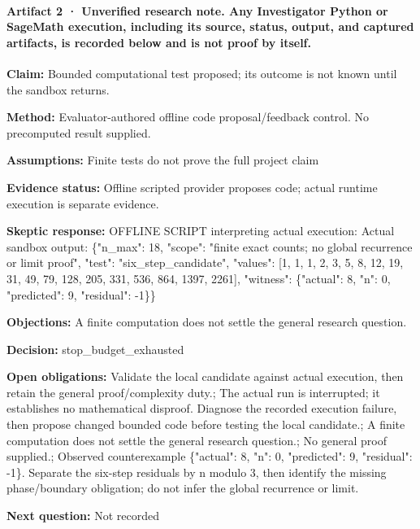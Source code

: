 \documentclass[11pt]{article}
\begin{document}
\paragraph{Artifact 2 · Unverified research note. Any Investigator Python or SageMath execution, including its source, status, output, and captured artifacts, is recorded below and is not proof by itself.}
\textbf{Claim:} Bounded computational test proposed; its outcome is not known until the sandbox returns.\par
\textbf{Method:} Evaluator-authored offline code proposal/feedback control. No precomputed result supplied.\par
\textbf{Assumptions:} Finite tests do not prove the full project claim\par
\textbf{Evidence status:} Offline scripted provider proposes code; actual runtime execution is separate evidence.\par
\textbf{Skeptic response:} OFFLINE SCRIPT interpreting actual execution: Actual sandbox output: \{"n\_max": 18, "scope": "finite exact counts; no global recurrence or limit proof", "test": "six\_step\_candidate", "values": [1, 1, 1, 2, 3, 5, 8, 12, 19, 31, 49, 79, 128, 205, 331, 536, 864, 1397, 2261], "witness": \{"actual": 8, "n": 0, "predicted": 9, "residual": -1\}\}\par
\textbf{Objections:} A finite computation does not settle the general research question.\par
\textbf{Decision:} stop\_budget\_exhausted\par
\textbf{Open obligations:} Validate the local candidate against actual execution, then retain the general proof/complexity duty.; The actual run is interrupted; it establishes no mathematical disproof. Diagnose the recorded execution failure, then propose changed bounded code before testing the local candidate.; A finite computation does not settle the general research question.; No general proof supplied.; Observed counterexample \{"actual": 8, "n": 0, "predicted": 9, "residual": -1\}. Separate the six-step residuals by n modulo 3, then identify the missing phase/boundary obligation; do not infer the global recurrence or limit.\par
\textbf{Next question:} Not recorded\par
\end{document}
